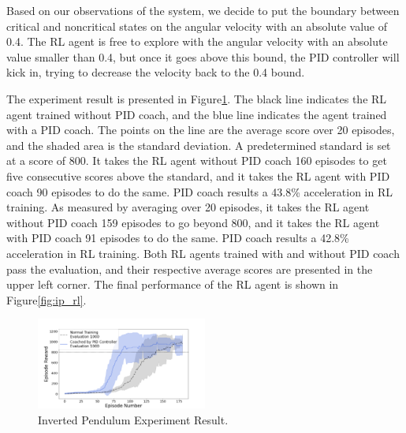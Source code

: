 \documentclass{IJCAS}
\begin{document}
Based on our observations of the system, we decide to put the boundary between critical and noncritical states on the angular velocity with an absolute value of 0.4. The RL agent is free to explore with the angular velocity with an absolute value smaller than 0.4, but once it goes above this bound, the PID controller will kick in, trying to decrease the velocity back to the 0.4 bound.

The experiment result is presented in Figure\ref{fig:ip_result}. The black line indicates the RL agent trained without PID coach, and the blue line indicates the agent trained with a PID coach. The points on the line are the average score over 20 episodes, and the shaded area is the standard deviation. A predetermined standard is set at a score of 800. It takes the RL agent without PID coach 160 episodes to get five consecutive scores above the standard, and it takes the RL agent with PID coach 90 episodes to do the same. PID coach results a 43.8\% acceleration in RL training. As measured by averaging over 20 episodes, it takes the RL agent without PID coach 159 episodes to go beyond 800, and it takes the RL agent with PID coach 91 episodes to do the same. PID coach results a 42.8\% acceleration in RL training. Both RL agents trained with and without PID coach pass the evaluation, and their respective average scores are presented in the upper left corner. The final performance of the RL agent is shown in Figure\ref{fig:ip_rl}.
\begin{figure}[H]
\centering
\includegraphics[width=0.5\textwidth]{ip.png}
\caption{Inverted Pendulum Experiment Result. }
\label{fig:ip_result}

\end{figure}
\end{document}
